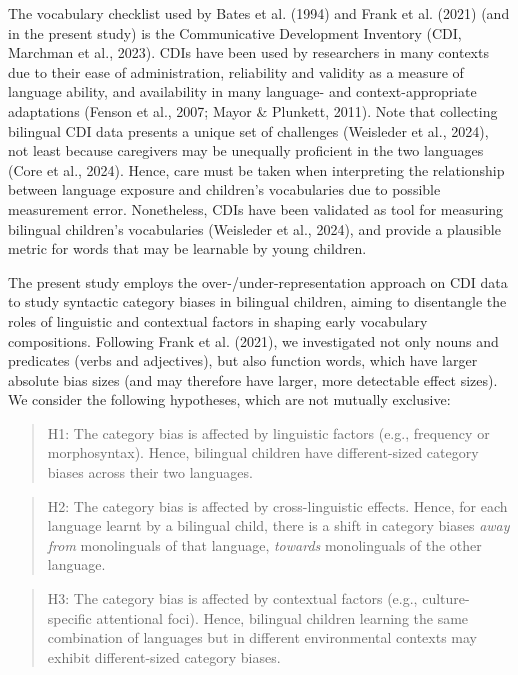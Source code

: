 \documentclass[10pt, letterpaper]{article}
\begin{document}
The vocabulary checklist used by Bates et al. (1994) and Frank et al.
(2021) (and in the present study) is the Communicative Development
Inventory (CDI, Marchman et al., 2023). CDIs have been used by
researchers in many contexts due to their ease of administration,
reliability and validity as a measure of language ability, and
availability in many language- and context-appropriate adaptations
(Fenson et al., 2007; Mayor \& Plunkett, 2011). Note that collecting
bilingual CDI data presents a unique set of challenges (Weisleder et
al., 2024), not least because caregivers may be unequally proficient in
the two languages (Core et al., 2024). Hence, care must be taken when
interpreting the relationship between language exposure and children's
vocabularies due to possible measurement error. Nonetheless, CDIs have
been validated as tool for measuring bilingual children's vocabularies
(Weisleder et al., 2024), and provide a plausible metric for words that
may be learnable by young children.

The present study employs the over-/under-representation approach on CDI
data to study syntactic category biases in bilingual children, aiming to
disentangle the roles of linguistic and contextual factors in shaping
early vocabulary compositions. Following Frank et al. (2021), we
investigated not only nouns and predicates (verbs and adjectives), but
also function words, which have larger absolute bias sizes (and may
therefore have larger, more detectable effect sizes). We consider the
following hypotheses, which are not mutually exclusive:

\begin{quote}
H1: The category bias is affected by linguistic factors (e.g., frequency
or morphosyntax). Hence, bilingual children have different-sized
category biases across their two languages.
\end{quote}

\begin{quote}
H2: The category bias is affected by cross-linguistic effects. Hence,
for each language learnt by a bilingual child, there is a shift in
category biases \emph{away from} monolinguals of that language,
\emph{towards} monolinguals of the other language.
\end{quote}

\begin{quote}
H3: The category bias is affected by contextual factors (e.g.,
culture-specific attentional foci). Hence, bilingual children learning
the same combination of languages but in different environmental
contexts may exhibit different-sized category biases.
\end{quote}
\end{document}

